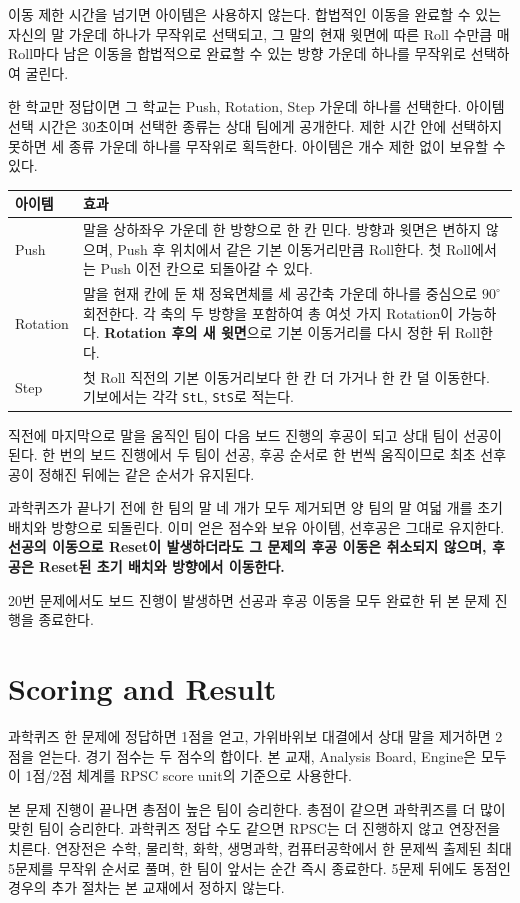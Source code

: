 이동 제한 시간을 넘기면 아이템은 사용하지 않는다. 합법적인 이동을 완료할 수 있는 자신의 말 가운데 하나가 무작위로 선택되고, 그 말의 현재 윗면에 따른 Roll 수만큼 매 Roll마다 남은 이동을 합법적으로 완료할 수 있는 방향 가운데 하나를 무작위로 선택하여 굴린다.

한 학교만 정답이면 그 학교는 Push, Rotation, Step 가운데 하나를 선택한다. 아이템 선택 시간은 30초이며 선택한 종류는 상대 팀에게 공개한다. 제한 시간 안에 선택하지 못하면 세 종류 가운데 하나를 무작위로 획득한다. 아이템은 개수 제한 없이 보유할 수 있다.

\begin{center}\renewcommand{\arraystretch}{1.18}\begin{tabular}{@{}L{0.20\textwidth}L{0.68\textwidth}@{}}\toprule
아이템 & 효과 \\\midrule
Push & 말을 상하좌우 가운데 한 방향으로 한 칸 민다. 방향과 윗면은 변하지 않으며, Push 후 위치에서 같은 기본 이동거리만큼 Roll한다. 첫 Roll에서는 Push 이전 칸으로 되돌아갈 수 있다. \\
Rotation & 말을 현재 칸에 둔 채 정육면체를 세 공간축 가운데 하나를 중심으로 $90^\circ$ 회전한다. 각 축의 두 방향을 포함하여 총 여섯 가지 Rotation이 가능하다. \textbf{Rotation 후의 새 윗면}으로 기본 이동거리를 다시 정한 뒤 Roll한다. \\
Step & 첫 Roll 직전의 기본 이동거리보다 한 칸 더 가거나 한 칸 덜 이동한다. 기보에서는 각각 \texttt{StL}, \texttt{StS}로 적는다. \\\bottomrule
\end{tabular}\end{center}

직전에 마지막으로 말을 움직인 팀이 다음 보드 진행의 후공이 되고 상대 팀이 선공이 된다. 한 번의 보드 진행에서 두 팀이 선공, 후공 순서로 한 번씩 움직이므로 최초 선후공이 정해진 뒤에는 같은 순서가 유지된다.

과학퀴즈가 끝나기 전에 한 팀의 말 네 개가 모두 제거되면 양 팀의 말 여덟 개를 초기 배치와 방향으로 되돌린다. 이미 얻은 점수와 보유 아이템, 선후공은 그대로 유지한다. \textbf{선공의 이동으로 Reset이 발생하더라도 그 문제의 후공 이동은 취소되지 않으며, 후공은 Reset된 초기 배치와 방향에서 이동한다.}

20번 문제에서도 보드 진행이 발생하면 선공과 후공 이동을 모두 완료한 뒤 본 문제 진행을 종료한다.

\section{Scoring and Result}

과학퀴즈 한 문제에 정답하면 1점을 얻고, 가위바위보 대결에서 상대 말을 제거하면 2점을 얻는다. 경기 점수는 두 점수의 합이다. 본 교재, Analysis Board, Engine은 모두 이 1점/2점 체계를 RPSC score unit의 기준으로 사용한다.

본 문제 진행이 끝나면 총점이 높은 팀이 승리한다. 총점이 같으면 과학퀴즈를 더 많이 맞힌 팀이 승리한다. 과학퀴즈 정답 수도 같으면 RPSC는 더 진행하지 않고 연장전을 치른다. 연장전은 수학, 물리학, 화학, 생명과학, 컴퓨터공학에서 한 문제씩 출제된 최대 5문제를 무작위 순서로 풀며, 한 팀이 앞서는 순간 즉시 종료한다. 5문제 뒤에도 동점인 경우의 추가 절차는 본 교재에서 정하지 않는다.
